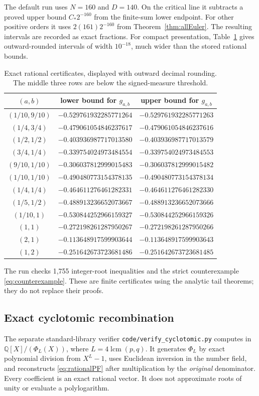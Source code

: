 \documentclass[11pt]{article}
\numberwithin{equation}{section}
\theoremstyle{definition}\newtheorem{definition}[theorem]{Definition}
\theoremstyle{remark}\newtheorem{remark}[theorem]{Remark}
\newcommand{\Q}{\mathbb Q}
\newcommand{\CC}{C_*}
\begin{document}
The default run uses $N=160$ and $D=140$. On the critical line it
subtracts a proved upper bound $\CC 2^{-160}$ from the finite-sum
lower endpoint. For other positive orders it uses
$2(161)2^{-160}$ from Theorem~\ref{thm:allEuler}. The resulting
intervals are recorded as exact fractions. For compact presentation,
Table~\ref{tab:values} gives outward-rounded intervals of width
$10^{-18}$, much wider than the stored rational bounds.

\begin{table}[htbp]\centering\small
\begin{tabular}{@{}ccc@{}}
\toprule
$(a,b)$ & lower bound for $g_{a,b}$ & upper bound for $g_{a,b}$\\
\midrule
$(1/10,9/10)$ & $-0.529761932285771264$ & $-0.529761932285771263$\\
$(1/4,3/4)$   & $-0.479061054846237617$ & $-0.479061054846237616$\\
$(1/2,1/2)$   & $-0.403936987717013580$ & $-0.403936987717013579$\\
$(3/4,1/4)$   & $-0.339754024973484554$ & $-0.339754024973484553$\\
$(9/10,1/10)$ & $-0.306037812999015483$ & $-0.306037812999015482$\\
\midrule
$(1/10,1/10)$ & $-0.490480773154378135$ & $-0.490480773154378134$\\
$(1/4,1/4)$   & $-0.464611276461282331$ & $-0.464611276461282330$\\
$(1/5,1/2)$   & $-0.488913236652073667$ & $-0.488913236652073666$\\
\midrule
$(1/10,1)$ & $-0.530844252966159327$ & $-0.530844252966159326$\\
$(1,1)$ & $-0.272198261287950267$ & $-0.272198261287950266$\\
$(2,1)$ & $-0.113648917599903644$ & $-0.113648917599903643$\\
$(1,2)$ & $-0.251642673723681486$ & $-0.251642673723681485$\\
\bottomrule
\end{tabular}
\caption{Exact rational certificates, displayed with outward decimal rounding.
The middle three rows are below the signed-measure threshold.}
\label{tab:values}
\end{table}

The run checks 1,755 integer-root inequalities and the strict
counterexample \eqref{eq:counterexample}. These are finite certificates
using the analytic tail theorems; they do not replace their proofs.

\subsection{Exact cyclotomic recombination}
The separate standard-library verifier
\texttt{code/verify\_cyclotomic.py} computes in
$\Q[X]/(\Phi_L(X))$, where $L=4\operatorname{lcm}(p,q)$.
It generates $\Phi_L$ by exact polynomial division from $X^L-1$,
uses Euclidean inversion in the number field, and reconstructs
\eqref{eq:rationalPF} after multiplication by the \emph{original}
denominator. Every coefficient is an exact rational vector. It does
not approximate roots of unity or evaluate a polylogarithm.
\end{document}

